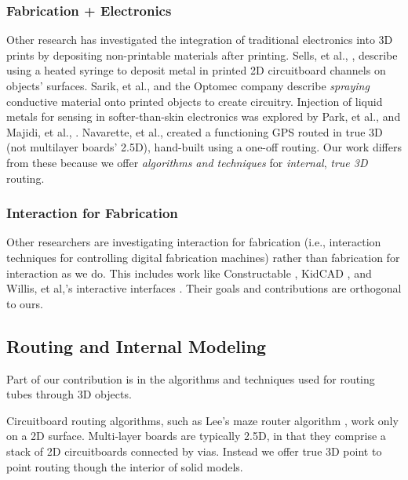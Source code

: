 \subsubsection{Fabrication + Electronics}

Other research has investigated the integration of traditional electronics into 3D prints by depositing non-printable materials after printing.  Sells, et al., \cite{Sells-reprap}, describe using a heated syringe to deposit metal in printed 2D circuitboard channels on objects' surfaces.  Sarik, et al., \cite{Sarik-tracebrush} and the Optomec company \cite{optomec} describe \emph{spraying} conductive material onto printed objects to create circuitry.  Injection of liquid metals for sensing in softer-than-skin electronics was explored by Park, et al., \cite{Park-microchannels} and Majidi, et al., \cite{Majidi-curvature}.  Navarette, et al., created a functioning GPS routed in true 3D (not multilayer boards' 2.5D), hand-built using a one-off routing.  Our work differs from these because we offer \emph{algorithms and techniques} for \emph{internal}, \emph{true 3D} routing.

\subsubsection{Interaction for Fabrication}

Other researchers are investigating interaction for fabrication (i.e., interaction techniques for controlling digital fabrication machines) rather than fabrication for interaction as we do.  This includes work like Constructable \cite{Mueller-constructable}, KidCAD \cite{Follmer-kidcad}, and Willis, et al,'s interactive interfaces \cite{Willis-interactive}. Their goals and contributions are orthogonal to ours.

\subsection{Routing and Internal Modeling}

Part of our contribution is in the algorithms and techniques used for routing tubes through 3D objects.

Circuitboard routing algorithms, such as Lee's maze router algorithm \cite{Lee-maze}, work only on a 2D surface. Multi-layer boards are typically 2.5D, in that they comprise a stack of 2D circuitboards connected by vias.  Instead we offer true 3D point to point routing though the interior of solid models.


